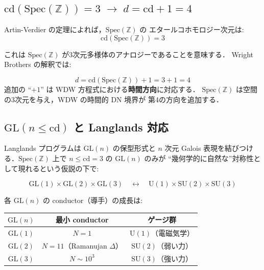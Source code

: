 \subsection{$\mathrm{cd}(\mathrm{Spec}(\mathbb{Z})) = 3 \;\to\; d = \mathrm{cd} + 1 = 4$}

Artin-Verdier の定理によれば，$\mathrm{Spec}(\mathbb{Z})$ の
エタールコホモロジー次元は:
\begin{equation}
\mathrm{cd}(\mathrm{Spec}(\mathbb{Z})) = 3
\end{equation}

これは $\mathrm{Spec}(\mathbb{Z})$ が3次元多様体のアナロジーであることを意味する．
Wright Brothers の解釈では:

\begin{keyresult}[時空次元の導出]
\begin{equation}
d = \mathrm{cd}(\mathrm{Spec}(\mathbb{Z})) + 1 = 3 + 1 = 4
\end{equation}
追加の ``$+1$'' は WDW 方程式における\textbf{時間方向}に対応する．
$\mathrm{Spec}(\mathbb{Z})$ は空間の3次元を与え，WDW の時間的 DN 境界が
第4の方向を追加する．
\end{keyresult}

\subsection{$\mathrm{GL}(n \leq \mathrm{cd})$ と Langlands 対応}

Langlands プログラムは $\mathrm{GL}(n)$ の保型形式と $n$ 次元
Galois 表現を結びつける．$\mathrm{Spec}(\mathbb{Z})$ 上で
$n \leq \mathrm{cd} = 3$ の $\mathrm{GL}(n)$ のみが
``幾何学的に自然な''対称性として現れるという仮説の下で:

\begin{equation}
\mathrm{GL}(1) \times \mathrm{GL}(2) \times \mathrm{GL}(3)
\quad\longleftrightarrow\quad
\mathrm{U}(1) \times \mathrm{SU}(2) \times \mathrm{SU}(3)
\end{equation}

各 $\mathrm{GL}(n)$ の conductor（導手）の成長は:
\begin{center}
\begin{tabular}{ccc}
\toprule
$\mathrm{GL}(n)$ & 最小 conductor & ゲージ群 \\
\midrule
$\mathrm{GL}(1)$ & $N = 1$ & $\mathrm{U}(1)$（電磁気学）\\
$\mathrm{GL}(2)$ & $N = 11$（Ramanujan $\Delta$）& $\mathrm{SU}(2)$（弱い力）\\
$\mathrm{GL}(3)$ & $N \sim 10^3$ & $\mathrm{SU}(3)$（強い力）\\
\bottomrule
\end{tabular}
\end{center}

